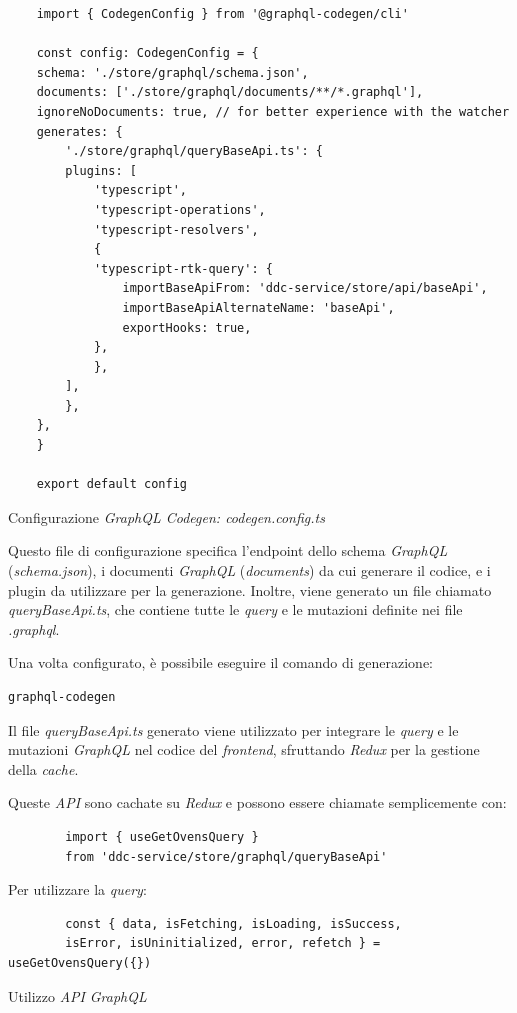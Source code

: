 \begin{listing}[H]
    \begin{verbatim}
    import { CodegenConfig } from '@graphql-codegen/cli'

    const config: CodegenConfig = {
    schema: './store/graphql/schema.json',
    documents: ['./store/graphql/documents/**/*.graphql'],
    ignoreNoDocuments: true, // for better experience with the watcher
    generates: {
        './store/graphql/queryBaseApi.ts': {
        plugins: [
            'typescript',
            'typescript-operations',
            'typescript-resolvers',
            {
            'typescript-rtk-query': {
                importBaseApiFrom: 'ddc-service/store/api/baseApi',
                importBaseApiAlternateName: 'baseApi',
                exportHooks: true,
            },
            },
        ],
        },
    },
    }

    export default config
    \end{verbatim}
    \caption{Configurazione \textit{GraphQL Codegen: codegen.config.ts}}
    \label{listing_confgraphql_codegen}
\end{listing}

Questo file di configurazione specifica l'endpoint dello schema \textit{GraphQL} (\textit{schema.json}), 
i documenti \textit{GraphQL} (\textit{documents}) da cui generare il codice, e i plugin da utilizzare per la generazione.
Inoltre, viene generato un file chiamato \textit{queryBaseApi.ts}, che contiene tutte le \textit{query} e le mutazioni definite nei file \textit{.graphql}.

Una volta configurato, è possibile eseguire il comando di generazione:

\begin{verbatim}
graphql-codegen
\end{verbatim}

Il file \textit{queryBaseApi.ts} generato viene utilizzato per integrare le \textit{query} e le mutazioni \textit{GraphQL} nel codice del \textit{frontend}, sfruttando \textit{Redux} per la gestione della \textit{cache}.

Queste \textit{API} sono cachate su \textit{Redux} e possono essere chiamate semplicemente con:

\begin{listing}[H]
    \begin{verbatim}
        import { useGetOvensQuery } 
        from 'ddc-service/store/graphql/queryBaseApi'
    \end{verbatim}
    Per utilizzare la \textit{query}:
    \begin{verbatim}
        const { data, isFetching, isLoading, isSuccess, 
        isError, isUninitialized, error, refetch } = useGetOvensQuery({})
    \end{verbatim}
    \caption{Utilizzo \textit{API} \textit{GraphQL}}
    \label{listing_utilizzo_api}
\end{listing}

